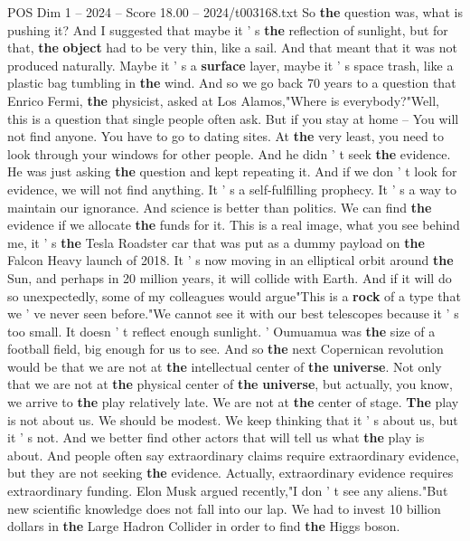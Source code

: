\begin{textsample}{POS Dim 1 – 2024 – Score 18.00 – 2024/t003168.txt}
So \textbf{the} question was, what is pushing it?
And I suggested that maybe it ' s \textbf{the} reflection of sunlight, but for that, \textbf{the} \textbf{object} had to be very thin, like a sail.
And that meant that it was not produced naturally.
Maybe it ' s a \textbf{surface} layer, maybe it ' s space trash, like a plastic bag tumbling in \textbf{the} wind.
And so we go back 70 years to a question that Enrico Fermi, \textbf{the} physicist, asked at Los Alamos,"Where is everybody?"Well, this is a question that single people often ask.
But if you stay at home -- You will not find anyone.
You have to go to dating sites.
At \textbf{the} very least, you need to look through your windows for other people.
And he didn ' t seek \textbf{the} evidence.
He was just asking \textbf{the} question and kept repeating it.
And if we don ' t look for evidence, we will not find anything.
It ' s a self-fulfilling prophecy.
It ' s a way to maintain our ignorance.
And science is better than politics.
We can find \textbf{the} evidence if we allocate \textbf{the} funds for it.
This is a real image, what you see behind me, it ' s \textbf{the} Tesla Roadster car that was put as a dummy payload on \textbf{the} Falcon Heavy launch of 2018.
It ' s now moving in an elliptical orbit around \textbf{the} Sun, and perhaps in 20 million years, it will collide with Earth.
And if it will do so unexpectedly, some of my colleagues would argue"This is a \textbf{rock} of a type that we ' ve never seen before."We cannot see it with our best telescopes because it ' s too small.
It doesn ' t reflect enough sunlight. ' Oumuamua was \textbf{the} size of a football field, big enough for us to see.
And so \textbf{the} next Copernican revolution would be that we are not at \textbf{the} intellectual center of \textbf{the} \textbf{universe}.
Not only that we are not at \textbf{the} physical center of \textbf{the} \textbf{universe}, but actually, you know, we arrive to \textbf{the} play relatively late.
We are not at \textbf{the} center of stage. \textbf{The} play is not about us.
We should be modest.
We keep thinking that it ' s about us, but it ' s not.
And we better find other actors that will tell us what \textbf{the} play is about.
And people often say extraordinary claims require extraordinary evidence, but they are not seeking \textbf{the} evidence.
Actually, extraordinary evidence requires extraordinary funding.
Elon Musk argued recently,"I don ' t see any aliens."But new scientific knowledge does not fall into our lap.
We had to invest 10 billion dollars in \textbf{the} Large Hadron Collider in order to find \textbf{the} Higgs boson.

\end{textsample}
